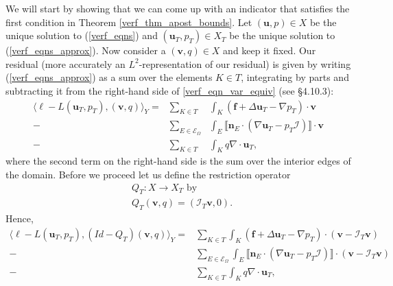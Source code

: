 \documentclass[12pt,a4paper]{article}
\theoremstyle{definition}
\begin{document}
We will start by showing that we can come up with an indicator that satisfies the first condition in Theorem \ref{verf_thm_apost_bounds}.  Let $\left(\textbf{u},p\right)\in X$ be the unique solution to (\ref{verf_eqns}) and $\left(\textbf{u}_T,p_T\right)\in X_T$ be the unique solution to (\ref{verf_eqns_approx}).  Now consider a $\left(\textbf{v},q\right)\in X$ and keep it fixed.  Our residual (more accurately an $L^2$-representation of our residual) is given by writing (\ref{verf_eqns_approx}) as a sum over the elements $K\in T$, integrating by parts and subtracting it from the right-hand side of \ref{verf_eqn_var_equiv} (see \cite{verfurth2013posteriori} \S 4.10.3):
\begin{eqnarray}\label{L2-rep-residual}
\langle \ell -L\left(\textbf{u}_T,p_T\right),\left(\textbf{v},q\right) \rangle_Y= &\sum_{K\in T}&\int_{K}\left(\textbf{f}+\Delta \textbf{u}_T-\nabla p_T\right)\cdot \textbf{v}\nonumber\\-&\sum_{E\in \mathcal{E}_{\Omega}}&\int_{E}\llbracket\textbf{n}_E\cdot\left(\nabla \textbf{u}_T-p_T\mathcal{I}\right)\rrbracket \cdot \textbf{v}\\
-&\sum_{K\in T}&\int_{K}q \nabla \cdot \textbf{u}_T, \nonumber
\end{eqnarray}
where the second term on the right-hand side is the sum over the interior edges of the domain.   Before we proceed let us define the restriction operator 
\begin{equation}
\begin{aligned}
&Q_T:X\rightarrow X_T\text{ by}\\
&Q_T\left(\textbf{v},q\right)=\left(\mathcal{I}_T\textbf{v},0\right).
\end{aligned}
\end{equation}
Hence,
\begin{equation}\label{verf-a-posteriori-bound}
\begin{aligned}
\langle \ell -L\left(\textbf{u}_T,p_T\right),\left(Id-Q_T\right)\left(\textbf{v},q\right) \rangle_Y= &\sum_{K\in T}\int_{K}\left(\textbf{f}+\Delta \textbf{u}_T-\nabla p_T\right)\cdot \left(\textbf{v}-\mathcal{I}_T\textbf{v}\right)\\-&\sum_{E\in \mathcal{E}_{\Omega}}\int_{E}\llbracket\textbf{n}_E\cdot\left(\nabla \textbf{u}_T-p_T\mathcal{I}\right)\rrbracket \cdot \left(\textbf{v}-\mathcal{I}_T\textbf{v}\right)\\
-&\sum_{K\in T}\int_{K}q \nabla \cdot \textbf{u}_T, 
\end{aligned}
\end{equation}
\end{document}
